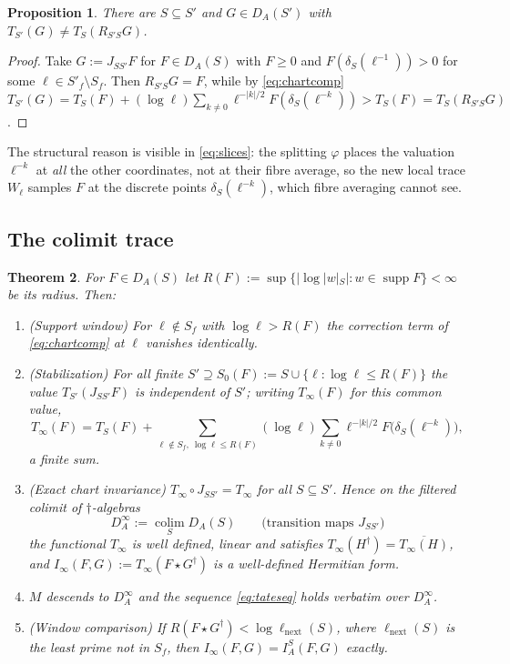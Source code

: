\documentclass[11pt]{amsart}
\newtheorem{theorem}{Theorem}[section]
\newtheorem{proposition}[theorem]{Proposition}
\theoremstyle{definition}
\theoremstyle{remark}
\newcommand{\supp}{\operatorname{supp}}
\newcommand{\DA}{D_A}
\begin{document}
\begin{proposition}\label{prop:resnotrace}
There are $S\subseteq S'$ and $G\in\DA(S')$ with $T_{S'}(G)\ne T_S(R_{S'S}G)$.
\end{proposition}

\begin{proof}
Take $G:=J_{SS'}F$ for $F\in\DA(S)$ with $F\ge0$ and
$F(\delta_S(\ell^{-1}))>0$ for some $\ell\in S'_f\setminus S_f$.  Then
$R_{S'S}G=F$, while by \eqref{eq:chartcomp}
$T_{S'}(G)=T_S(F)+(\log\ell)\sum_{k\ne0}\ell^{-|k|/2}F(\delta_S(\ell^{-k}))>
T_S(F)=T_S(R_{S'S}G)$.
\end{proof}

The structural reason is visible in \eqref{eq:slices}: the splitting $\varphi$
places the valuation $\ell^{-k}$ at \emph{all} the other coordinates, not at
their fibre average, so the new local trace $W_{\ell}$ samples $F$ at the
discrete points $\delta_S(\ell^{-k})$, which fibre averaging cannot see.

\subsection{The colimit trace}

\begin{theorem}\label{thm:colimtrace}
For $F\in\DA(S)$ let $R(F):=\sup\{|\log|w|_S|:w\in\supp F\}<\infty$ be its
\emph{radius}.  Then:
\begin{enumerate}
\item[(a)] \emph{(Support window)}  For $\ell\notin S_f$ with $\log\ell>R(F)$
the correction term of \eqref{eq:chartcomp} at $\ell$ vanishes identically.
\item[(b)] \emph{(Stabilization)}  For all finite $S'\supseteq
S_0(F):=S\cup\{\ell:\log\ell\le R(F)\}$ the value $T_{S'}(J_{SS'}F)$ is independent
of $S'$; writing $T_{\infty}(F)$ for this common value,
\begin{equation}\label{eq:Tinf}
T_{\infty}(F)=T_S(F)+\sum_{\ell\notin S_f,\ \log\ell\le R(F)}(\log\ell)
\sum_{k\ne0}\ell^{-|k|/2}F\bigl(\delta_S(\ell^{-k})\bigr),
\end{equation}
a finite sum.
\item[(c)] \emph{(Exact chart invariance)}  $T_{\infty}\circ J_{SS'}=T_{\infty}$
for all $S\subseteq S'$.  Hence on the filtered colimit of $\dagger$-algebras
\begin{equation}\label{eq:colim}
\DA^{\infty}:=\operatorname*{colim}_{S}\DA(S)\qquad
\text{(transition maps }J_{SS'})
\end{equation}
the functional $T_{\infty}$ is well defined, linear and satisfies
$T_{\infty}(H^{\dagger})=\overline{T_{\infty}(H)}$, and
$I_{\infty}(F,G):=T_{\infty}(F\star G^{\dagger})$ is a well-defined Hermitian
form.
\item[(d)] $M$ descends to $\DA^{\infty}$ and the sequence
\eqref{eq:tateseq} holds verbatim over $\DA^{\infty}$.
\item[(e)] \emph{(Window comparison)}  If $R(F\star G^{\dagger})<
\log\ell_{\mathrm{next}}(S)$, where $\ell_{\mathrm{next}}(S)$ is the least
prime not in $S_f$, then $I_{\infty}(F,G)=I_A^{S}(F,G)$ exactly.
\end{enumerate}
\end{theorem}
\end{document}
